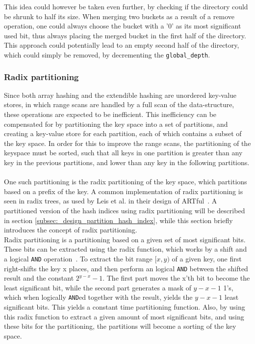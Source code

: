 \documentclass[11pt]{article} %
\begin{document}
This idea could however be taken even further, by checking if the directory could be shrunk to half its size. When merging two buckets as a result of a remove operation, one could always choose the bucket with a '0' as its most significant used bit, thus always placing the merged bucket in the first half of the directory. This approach could potentially lead to an empty second half of the directory, which could simply be removed, by decrementing the \verb|global_depth|. 

\subsubsection{Radix partitioning}
\label{subsubsec:background_radix_partitioning}
Since both array hashing and the extendible hashing are unordered key-value stores, in which range scans are handled by a full scan of the data-structure, these operations are expected to be inefficient. This inefficiency can be compensated for by partitioning the key space into a set of partitions, and creating a key-value store for each partition, each of which contains a subset of the key space. In order for this to improve the range scans, the partitioning of the keyspace must be sorted, such that all keys in one partition is greater than any key in the previous partitions, and lower than any key in the following partitions. \\
\\
One such partitioning is the radix partitioning of the key space, which partitions based on a prefix of the key. A common implementation of radix partitioning is seen in radix trees, as used by Leis et al. in their design of ARTful~\cite{ARTful}. A partitioned version of the hash indices using radix partitioning will be described in section \ref{subsec:_design_partition_hash_index}, while this section briefly introduces the concept of radix partitioning.\\

Radix partitioning is a partitioning based on a given set of most significant bits. These bits can be extracted using the radix function, which works by a shift and a logical \verb|AND| operation~\cite{radix}. To extract the bit range $[x, y)$ of a given key, one first right-shifts the key x places, and then perform an logical \verb|AND| between the shifted result and the constant $2^{y-x}-1$. The first part moves the x'th bit to become the least significant bit, while the second part generates a mask of $y-x-1$ 1's, which when logically \verb|AND|ed together with the result, yields the $y-x-1$ least significant bits. This yields a constant time partitioning function. Also, by using this radix function to extract a given amount of most significant bits, and using these bits for the partitioning, the partitions will become a sorting of the key space.
\newpage
\end{document}
